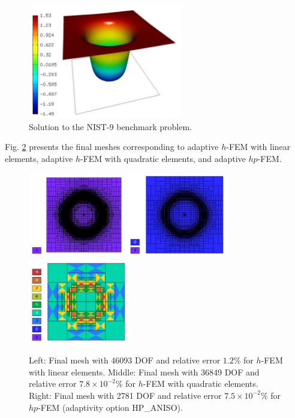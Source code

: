 \documentclass[12pt]{elsarticle}
\begin{document}
\begin{figure}[H]
\centering
\vspace{-3mm}
\includegraphics[height=5cm]{mafig53.pdf}
\vspace{-1mm}
\caption{Solution to the NIST-9 benchmark problem.}
\vspace{-1mm}
\label{fig:sln-nist09}
\end{figure}

Fig. \ref{fig:nist-9-hp-aniso} presents the final meshes corresponding to adaptive $h$-FEM with
linear elements, adaptive $h$-FEM with quadratic elements, and adaptive $hp$-FEM.

\begin{figure}[H]
\centering
\includegraphics[height=3.7cm]{mafig54.pdf}
\includegraphics[height=3.7cm]{mafig55.pdf}
\includegraphics[height=3.7cm]{mafig56.pdf}
\caption{
Left: Final mesh with 46093 DOF and relative error $1.2$\% for $h$-FEM with linear elements.
Middle: Final mesh with 36849 DOF and relative error $7.8\times10^{-2}$\% for $h$-FEM with quadratic elements.
Right: Final mesh with 2781 DOF and relative error $7.5\times10^{-2}$\% for $hp$-FEM (adaptivity option HP\_ANISO).}
\vspace{-5mm}
\label{fig:nist-9-hp-aniso}
\end{figure}
\end{document}
